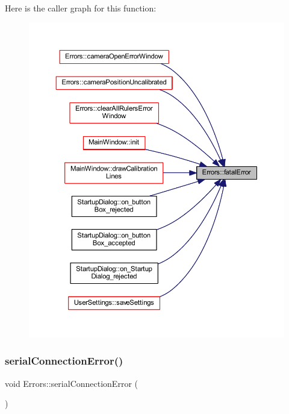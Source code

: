 Here is the caller graph for this function\+:
\nopagebreak
\begin{figure}[H]
\begin{center}
\leavevmode
\includegraphics[width=350pt]{class_errors_afe4cb66263186b59444271e7ca44e025_icgraph}
\end{center}
\end{figure}
\mbox{\label{class_errors_a5ed088325fbe34556ae24b8167eaf0fd}} 
\subsubsection{\texorpdfstring{serialConnectionError()}{serialConnectionError()}}
{\footnotesize\ttfamily void Errors\+::serial\+Connection\+Error (\begin{DoxyParamCaption}{ }\end{DoxyParamCaption})\hspace{0.3cm}{\ttfamily [static]}}



